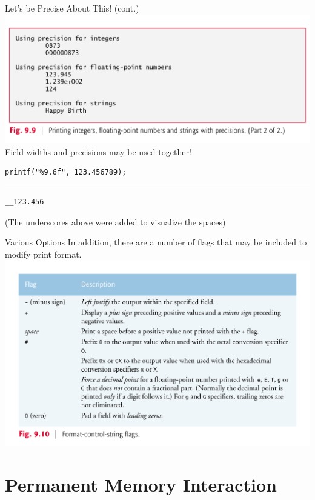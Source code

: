 \documentclass[11pt]{beamer}
\let\OldTexttt\texttt
\renewcommand{\texttt}[1]{\OldTexttt{\color{teal}{#1}}}
\begin{document}
\begin{frame}[fragile=singleslide]{Let's be Precise About This! (cont.)}
\center
\includegraphics[scale=0.12]{prec2.png}
\flushleft
Field widths and precisions may be used together! 
\begin{lstlisting}[style = C]
printf("%9.6f", 123.456789);
\end{lstlisting}
\hrule
\begin{lstlisting}[style=terminal]
__123.456
\end{lstlisting}
(The underscores above were added to visualize the spaces)
\end{frame}


\begin{frame}{Various Options}
In addition, there are a number of flags that may be included to modify print format.
\center
\includegraphics[scale=0.10]{flags.png}
\end{frame}

\section[File I/O]{Permanent Memory Interaction}
\end{document}
